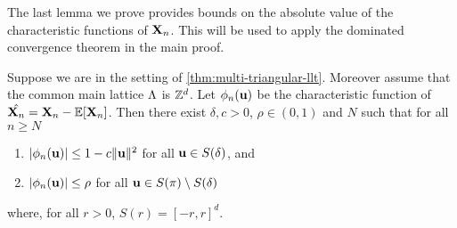 The last lemma we prove provides bounds on the absolute value of the characteristic functions of ${\mathbf X}_n$. This will be used to apply the dominated convergence theorem in the main proof.
\begin{lemma}
    \label{lem:dom-cf}
    Suppose we are in the setting of \cref{thm:multi-triangular-llt}. Moreover assume that the common main lattice $\Lambda$ is ${\mathbb Z}^d$. Let $\phi_n({\mathbf u})$ be the characteristic function of $\hat{{\mathbf X}_n} = {\mathbf X}_n - {\mathbb E}[{\mathbf X}_n]$. Then there exist $\delta, c> 0$, $\rho \in (0, 1)$ and $N$ such that for all $n \geq N$
    \begin{enumerate}
        \item $\lvert\phi_n({\mathbf u})\rvert \leq 1 - c \lVert{\mathbf u}\rVert^2$ for all ${\mathbf u} \in S(\delta)$, and
        \item $\lvert\phi_n({\mathbf u})\rvert \leq \rho$ for all ${\mathbf u} \in S(\pi) \setminus S(\delta)$
    \end{enumerate}
    where, for all $r > 0$, $S(r) = [-r, r]^d$.
\end{lemma}

